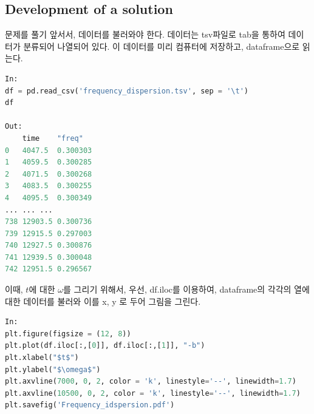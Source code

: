 \documentclass[11pt]{article}
\begin{document}
\subsection{Development of a solution} 
문제를 풀기 앞서서, 데이터를 불러와야 한다. 데이터는 tsv파일로 tab을 통하여 데이터가 분류되어 나열되어 있다. 이 데이터를 미리 컴퓨터에 저장하고, dataframe으로 읽는다.

\begin{lstlisting}[language=Python]
In:
df = pd.read_csv('frequency_dispersion.tsv', sep = '\t')
df

Out:
	time	"freq"
0	4047.5	0.300303
1	4059.5	0.300285
2	4071.5	0.300268
3	4083.5	0.300255
4	4095.5	0.300349
...	...	...
738	12903.5	0.300736
739	12915.5	0.297003
740	12927.5	0.300876
741	12939.5	0.300048
742	12951.5	0.296567
\end{lstlisting}
이때, $t$에 대한 $\omega$를 그리기 위해서, 우선, df.iloc를 이용하여, dataframe의 각각의 열에 대한 데이터를 불러와 이를 x, y 로 두어 그림을 그린다.

\begin{lstlisting}[language=Python]
In:
plt.figure(figsize = (12, 8))
plt.plot(df.iloc[:,[0]], df.iloc[:,[1]], "-b")
plt.xlabel("$t$")
plt.ylabel("$\omega$")
plt.axvline(7000, 0, 2, color = 'k', linestyle='--', linewidth=1.7)
plt.axvline(10500, 0, 2, color = 'k', linestyle='--', linewidth=1.7)
plt.savefig('Frequency_idspersion.pdf')
\end{lstlisting}
\end{document}
